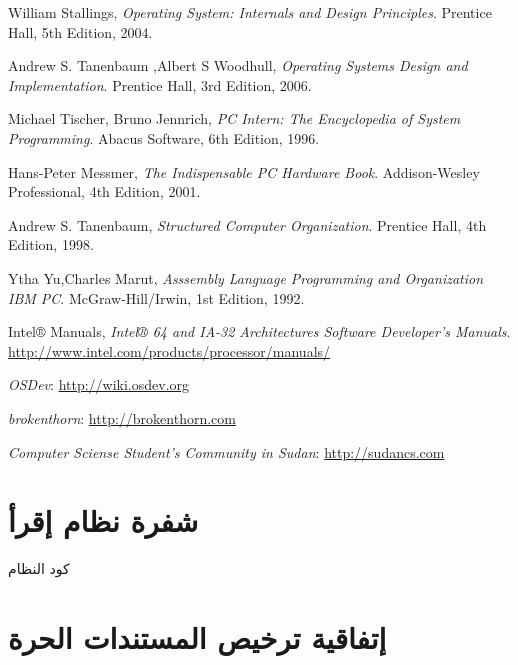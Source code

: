 \documentclass[document.tex]{subfiles}
\begin{document}
\begin{english}
\begin{thebibliography}{10}
 
  William Stallings,
  \emph{Operating System: Internals and Design Principles}.
  Prentice Hall,
  5th Edition,
  2004.
 
  Andrew S. Tanenbaum ,Albert S Woodhull,
  \emph{Operating Systems Design and Implementation}.
  Prentice Hall,
  3rd Edition,
   2006.

  Michael Tischer, Bruno Jennrich,
  \emph{PC Intern: The Encyclopedia of System Programming}.
  Abacus Software,
  6th Edition,
  1996.

  Hans-Peter Messmer,
  \emph{The Indispensable PC Hardware Book}.
  Addison-Wesley Professional,
  4th Edition,
  2001.

  Andrew S. Tanenbaum,
  \emph{Structured Computer Organization}.
  Prentice Hall,
  4th Edition,
  1998.

  Ytha Yu,Charles Marut,
  \emph{Asssembly Language Programming and Organization IBM PC}.
  McGraw-Hill/Irwin,
  1st Edition,
  1992.

  Intel® Manuals,
  \emph{Intel® 64 and IA-32 Architectures Software Developer's Manuals}.
  \url{http://www.intel.com/products/processor/manuals/}


   \emph{OSDev}:
   \url{http://wiki.osdev.org}

  \emph{brokenthorn}:
  \url{http://brokenthorn.com}

  \emph{Computer Sciense Student's Community in Sudan}:
  \url{http://sudancs.com}

\end{thebibliography}
\end{english}

\chapter{شفرة نظام إقرأ}
كود النظام

\chapter{إتفاقية ترخيص المستندات الحرة }
\begin{english}
%
\end{english}
\end{document}
